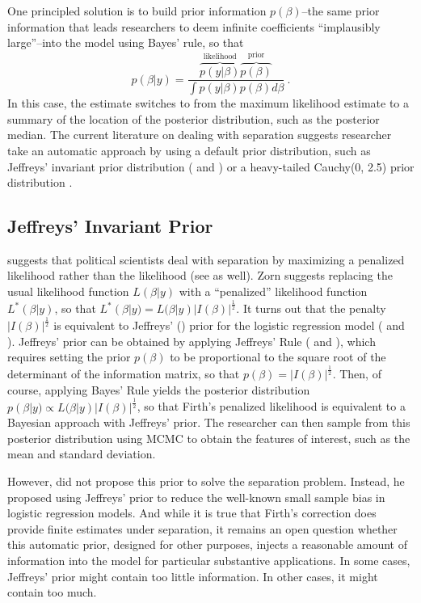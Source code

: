 \documentclass[12pt]{article}
\begin{document}
One principled solution is to build prior information $p(\beta)$--the same prior information that leads researchers to deem infinite coefficients ``implausibly large''--into the model using Bayes' rule, so that 
\begin{equation}\nonumber
p(\beta|y) = \dfrac{\overbrace{p(y|\beta)}^{\text{likelihood}}\overbrace{p(\beta)}^{\text{prior}}}{\int p(y|\beta)p(\beta) d\beta}~\text{.}
\end{equation}
\noindent In this case, the estimate switches to from the maximum likelihood estimate to a summary of the location of the posterior distribution, such as the posterior median. 
The current literature on dealing with separation suggests researcher take an automatic approach by using a default prior distribution, such as Jeffreys' invariant prior distribution (\citealt{Jeffreys1946} and \citealt{Zorn2005}) or a heavy-tailed Cauchy(0, 2.5) prior distribution \citep{Gelmanetal2008}.

\subsection*{Jeffreys' Invariant Prior}

\cite{Zorn2005} suggests that political scientists deal with separation by maximizing a penalized likelihood rather than the likelihood (see \citealt{HeinzeSchemper2002} as well). 
Zorn suggests replacing the usual likelihood function $L(\beta | y)$ with a ``penalized'' likelihood function $L^*(\beta | y)$, so that $L^*(\beta | y) = L(\beta | y)|I(\beta)|^\frac{1}{2}$. 
It turns out that the penalty $|I(\beta)|^\frac{1}{2}$ is equivalent to Jeffreys' (\citeyear{Jeffreys1946}) prior for the logistic regression model (\citealt{Firth1993} and \citealt{Poirier1994}). 
Jeffreys' prior can be obtained by applying Jeffreys' Rule (\citealt{Jeffreys1946} and \citealt[pp. 41-60]{BoxTaio2011}), which requires setting the prior $p(\beta)$ to be proportional to the square root of the determinant of the information matrix, so that $p(\beta) = |I(\beta)|^\frac{1}{2}$. 
Then, of course, applying Bayes' Rule yields the posterior distribution $p(\beta | y) \propto L(\beta | y)|I(\beta)|^\frac{1}{2}$, so that Firth's penalized likelihood is equivalent to a Bayesian approach with Jeffreys' prior. 
The researcher can then sample from this posterior distribution using MCMC to obtain the features of interest, such as the mean and standard deviation.

However, \cite{Firth1993} did not propose this prior to solve the separation problem. 
Instead, he proposed using Jeffreys' prior to reduce the well-known small sample bias in logistic regression models. 
And while it is true that Firth's correction does provide finite estimates under separation, it remains an open question whether this automatic prior, designed for other purposes, injects a reasonable amount of information into the model for particular substantive applications. 
In some cases, Jeffreys' prior might contain too little information. In other cases, it might contain too much.
\end{document}
